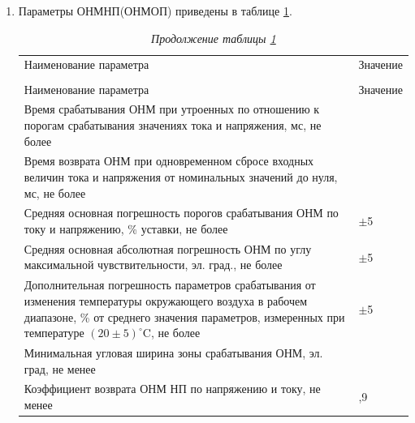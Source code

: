 \begin{enumerate}[label=\arabic{section}.\arabic{subsection}.\arabic{enumi}, labelsep=4pt, leftmargin=0pt, itemindent=57pt, itemsep=0pt, parsep=5pt]
\begin{enumerate}[label=\arabic{section}.\arabic{subsection}.\arabic{enumi}.\arabic*, labelsep=4pt, leftmargin=0em, itemindent=65pt, parsep=0pt]
\item
Параметры ОНМНП(ОНМОП) приведены в таблице \ref{desc_tnznp:tbl2}.

\small
\setlength{\extrarowheight}{0.05cm} %
\begin{longtable}
{|>{\centering\arraybackslash}m{15.2cm}|>{\centering\arraybackslash}m{1.7cm}|}
\caption{Параметры ОНМНП(ОНМОП)\hfill\vspace{-0.5\baselineskip}}\label{desc_tnznp:tbl2}\\ 
\hhline{|-|-|}
\rowcolor{gray!30}
Наименование параметра & Значение  \\ 
\hhline{|-|-|}
\endfirsthead

\caption*{\hspace{3pt}\emph{Продолжение таблицы \ref{desc_tnznp:tbl2}\hfill\vspace{-0.5\baselineskip}}} \\ %
\hhline{|-|-|}
\rowcolor{gray!30}
Наименование параметра & Значение  \\ 
\hhline{|-|-|}
\endhead
\hhline{|-|-|}

\endfoot
\endlastfoot

\raggedright Время срабатывания ОНМ при утроенных по отношению к порогам срабатывания значениях тока и напряжения, мс, не более & \centering\arraybackslash 35  \\  \hline
\raggedright Время возврата ОНМ при одновременном сбросе входных величин тока и напряжения от номинальных значений до нуля, мс, не более  & \centering\arraybackslash 25  \\  \hline
\raggedright Средняя основная погрешность порогов срабатывания ОНМ по току и напряжению, \% уставки, не более   & \centering\arraybackslash $\pm$5  \\  \hline
\raggedright Средняя основная абсолютная погрешность ОНМ по углу максимальной чувствительности, эл. град., не более & \centering\arraybackslash $\pm$5 \\  \hline
\raggedright Дополнительная погрешность параметров срабатывания от изменения температуры окружающего воздуха в рабочем диапазоне, \% от среднего значения параметров, измеренных при температуре $(20\pm5)^\circ$C, не более & \centering\arraybackslash $\pm$5 \\  \hline
\raggedright Минимальная угловая ширина зоны срабатывания ОНМ, эл. град, не менее & \centering\arraybackslash 165 \\ \hline
\raggedright Коэффициент возврата ОНМ НП по напряжению и току, не менее  & \centering\arraybackslash 0,9\\  \hline


\end{longtable}
\end{enumerate}
\end{enumerate}
